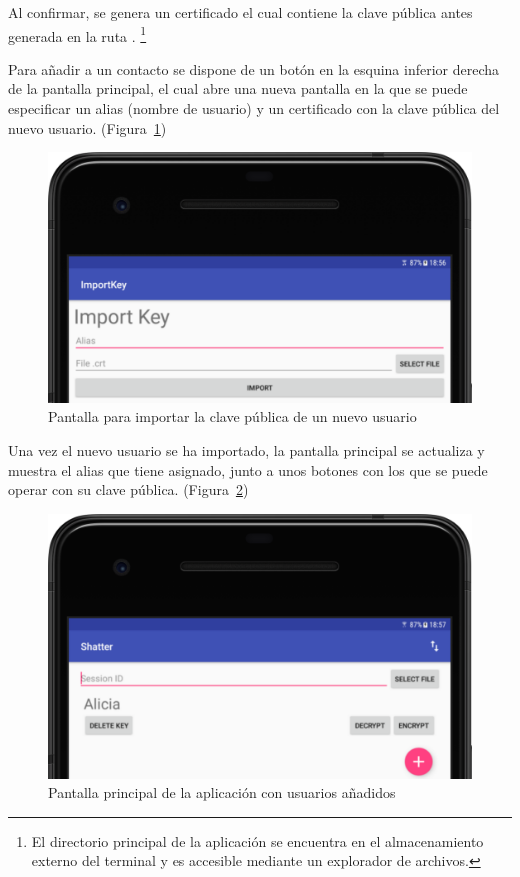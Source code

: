 Al confirmar, se genera un certificado el cual contiene la clave pública antes generada en la ruta . \footnote{El directorio principal de la aplicación se encuentra en el almacenamiento externo del terminal y es accesible mediante un explorador de archivos.}

Para añadir a un contacto se dispone de un botón en la esquina inferior derecha de la pantalla principal, el cual abre una nueva pantalla en la que se puede especificar un alias (nombre de usuario) y un certificado con la clave pública del nuevo usuario. (Figura~\ref{fig:import})

\begin{figure}[!htb]
  \centering
  \includegraphics[scale=0.4]{Figures/import}
  \decoRule
  \caption[Shatter (Importar clave pública)]{Pantalla para importar la clave pública de un nuevo usuario}
  \label{fig:import}
\end{figure}

Una vez el nuevo usuario se ha importado, la pantalla principal se actualiza y muestra el alias que tiene asignado, junto a unos botones con los que se puede operar con su clave pública. (Figura~\ref{fig:home_2})

\begin{figure}[!htb]
  \centering
  \includegraphics[scale=0.4]{Figures/home_2}
  \decoRule
  \caption[Shatter (Pantalla principal con usuarios)]{Pantalla principal de la aplicación con usuarios añadidos}
  \label{fig:home_2}
\end{figure}

